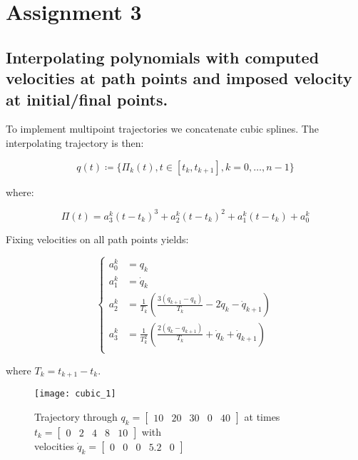 \section{Assignment 3}
\subsection{Interpolating polynomials with computed velocities at path points and imposed velocity at initial/final points.}

To implement multipoint trajectories we concatenate cubic splines. The interpolating trajectory is then:

\begin{equation*}
q(t)\coloneqq\{\Pi_k(t),t\in[t_k,t_{k+1}],k=0,\dots,n-1\}
\end{equation*}

where:

\begin{equation*}
\Pi(t)=a_3^k(t-t_k)^3+a_2^k(t-t_k)^2+a_1^k(t-t_k)+a_0^k
\end{equation*}

Fixing velocities on all path points yields:

\begin{equation*}
\begin{cases}
a_0^k&=q_k\\
a_1^k&=\dot q_k\\
a_2^k&=\frac{1}{T_k}\left(\frac{3(q_{k+1}-q_k)}{T_k}-2\dot q_k-\dot q_{k+1}\right)\\
a_3^k&=\frac{1}{T_k^2}\left(\frac{2(q_{k}-q_{k+1})}{T_k}+\dot q_k+\dot q_{k+1}\right)\\
\end{cases}
\end{equation*}

where $T_k=t_{k+1}-t_k$.

\begin{figure}[h]
\centering
\texttt{[image: cubic\_1]}
\caption{Trajectory through $q_k=\begin{bmatrix}
10 & 20 & 30 & 0 & 40
\end{bmatrix}$ at times $t_k=\begin{bmatrix}
0 & 2 & 4 & 8 & 10
\end{bmatrix}$ with \\velocities $\dot q_k=\begin{bmatrix}
0 & 0 & 0 & 5.2 & 0
\end{bmatrix}$}
\end{figure}

